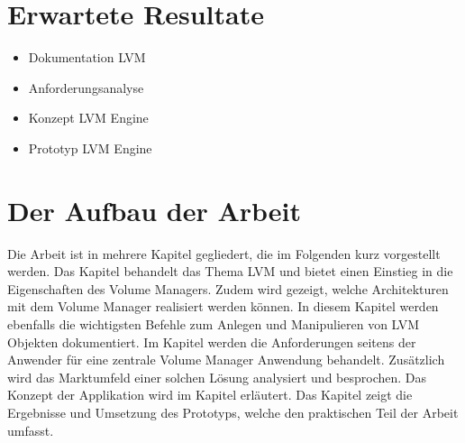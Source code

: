 \section{Erwartete Resultate}
\begin{itemize}
\item Dokumentation LVM
\item Anforderungsanalyse
\item Konzept LVM Engine
\item Prototyp LVM Engine
\end{itemize}

\section{Der Aufbau der Arbeit}
Die Arbeit ist in mehrere Kapitel gegliedert, die im Folgenden kurz vorgestellt werden. Das Kapitel    behandelt das Thema LVM und bietet einen Einstieg in die Eigenschaften des Volume Managers. Zudem wird gezeigt, welche Architekturen mit dem Volume Manager realisiert werden können. In diesem Kapitel werden ebenfalls die wichtigsten Befehle zum Anlegen und Manipulieren von LVM Objekten dokumentiert. Im Kapitel   werden die Anforderungen seitens der Anwender für eine zentrale Volume Manager Anwendung behandelt. Zusätzlich wird das Marktumfeld einer solchen Lösung analysiert und besprochen. Das Konzept der Applikation wird im Kapitel  erläutert. Das Kapitel  zeigt die Ergebnisse und Umsetzung des Prototyps, welche den praktischen Teil der Arbeit umfasst.

